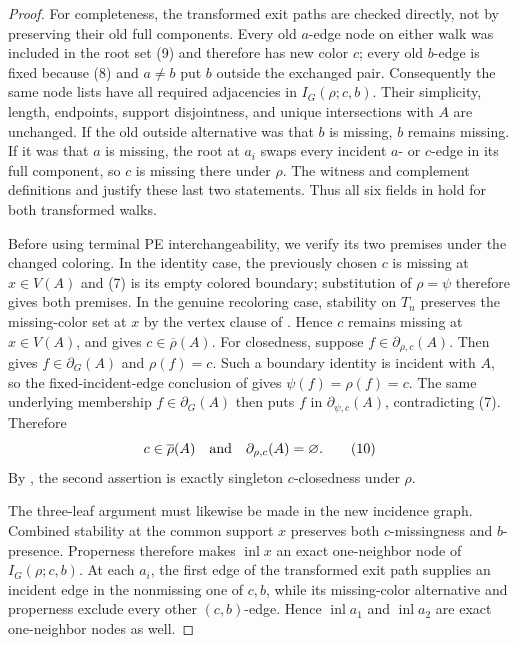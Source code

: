 \begin{proof}
For completeness, the transformed exit paths are checked directly, not by
preserving their old full components.  Every old $a$-edge node on either
walk was included in the root set (9) and
therefore has new color $c$; every old $b$-edge is fixed because (8) and
$a\ne b$ put $b$ outside the exchanged pair.  Consequently the same node
lists have all required adjacencies in $I_G(\rho;c,b)$.  Their simplicity,
length, endpoints, support disjointness, and unique intersections with
$A$ are unchanged.  If the old outside alternative was that $b$ is
missing, $b$ remains missing.  If it was that $a$ is missing, the root at
$a_i$ swaps every incident $a$- or $c$-edge in its full component, so $c$
is missing there under $\rho$.  The witness and complement definitions
 and  justify these last
two statements.  Thus all six fields in  hold for
both transformed walks.

Before using terminal PE interchangeability, we verify its two premises
under the changed coloring.  In the identity case, the previously chosen
$c$ is missing at $x\in V(A)$ and (7) is its empty colored boundary;
substitution of $\rho=\psi$ therefore gives both premises.  In the
genuine recoloring case, stability on
$T_n$ preserves the missing-color set at $x$ by the vertex clause of
.  Hence $c$ remains missing at $x\in V(A)$, and
 gives
$c\in\overline\rho(A)$.  For closedness, suppose
$f\in\partial_{\rho,c}(A)$.  Then  gives
$f\in\partial_G(A)$ and $\rho(f)=c$.  Such a boundary identity is
incident with $A$, so the fixed-incident-edge conclusion of
 gives
$\psi(f)=\rho(f)=c$.  The same underlying membership
$f\in\partial_G(A)$ then puts $f$ in
$\partial_{\psi,c}(A)$, contradicting (7).  Therefore
\[
 c\in\overline\rho(A)
 \quad\hbox{and}\quad
 \partial_{\rho,c}(A)=\varnothing.                  \tag{10}
\]
By , the second assertion is exactly
singleton $c$-closedness under $\rho$.

The three-leaf argument must likewise be made in the new incidence graph.
Combined stability at the common support $x$ preserves both $c$-missingness
and $b$-presence.  Properness therefore makes
$\operatorname{inl}x$ an exact one-neighbor node of
$I_G(\rho;c,b)$.  At each $a_i$, the first edge of the transformed exit
path supplies an incident edge in the nonmissing one of $c,b$, while its
missing-color alternative and properness exclude every other
$(c,b)$-edge.  Hence $\operatorname{inl}a_1$ and
$\operatorname{inl}a_2$ are exact one-neighbor nodes as well.


\end{proof}
